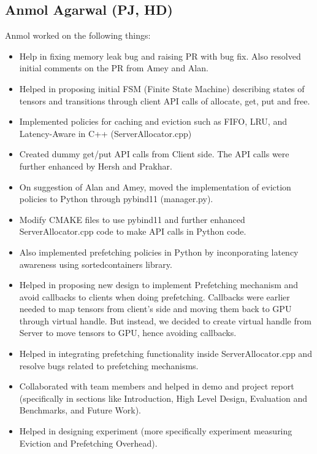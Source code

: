 \documentclass{article}
\begin{document}
\subsection{Anmol Agarwal (PJ, HD)}
Anmol worked on the following things:
\begin{itemize}
	\item Help in fixing memory leak bug and raising PR with bug fix. Also resolved initial comments on the PR from Amey and Alan.
	\item Helped in proposing initial FSM (Finite State Machine) describing states of tensors and transitions through client API calls
	of allocate, get, put and free.
	\item Implemented policies for caching and eviction such as FIFO, LRU, and Latency-Aware in C++ (ServerAllocator.cpp)
	\item Created dummy get/put API calls from Client side. The API calls were further enhanced by Hersh and Prakhar.
	\item On suggestion of Alan and Amey, moved the implementation of eviction policies to Python through pybind11 (manager.py).
	\item Modify CMAKE files to use pybind11 and further enhanced ServerAllocator.cpp code to make API calls in Python code.
	\item Also implemented prefetching policies in Python by inconporating latency awareness using sortedcontainers library.
	\item Helped in proposing new design to implement Prefetching mechanism and avoid callbacks to clients when doing prefetching.
	Callbacks were earlier needed to map tensors from client's side and moving them back to GPU through virtual handle. But instead,
	we decided to create virtual handle from Server to move tensors to GPU, hence avoiding callbacks.
	\item Helped in integrating prefetching functionality inside ServerAllocator.cpp and resolve bugs related to prefetching mechanisms.
	\item Collaborated with team members and helped in demo and project report (specifically in sections like Introduction, High Level Design,
	Evaluation and Benchmarks, and Future Work).
	\item Helped in designing experiment (more specifically experiment measuring Eviction and Prefetching Overhead).
\end{itemize}

\printbibliography

% 
\end{document}
